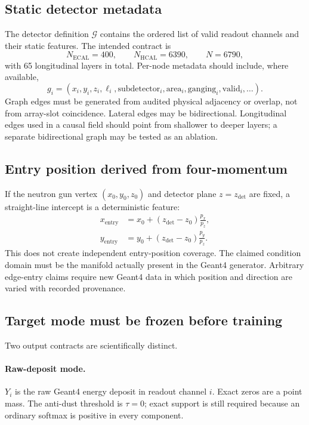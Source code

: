 \documentclass[11pt]{article}
\theoremstyle{definition}
\theoremstyle{remark}
\newcommand{\G}{\mathcal{G}}
\begin{document}
\subsection{Static detector metadata}
The detector definition $\G$ contains the ordered list of valid readout channels and their static features. The intended contract is
\begin{equation}
  N_{\mathrm{ECAL}}=400,\qquad N_{\mathrm{HCAL}}=6390,
  \qquad N=6790,
\end{equation}
with 65 longitudinal layers in total. Per-node metadata should include, where available,
\begin{equation}
  g_i=(x_i,y_i,z_i,\ell_i,\text{subdetector}_i,\text{area}_i,
  \text{ganging}_i,\text{valid}_i,\ldots).
\end{equation}
Graph edges must be generated from audited physical adjacency or overlap, not from array-slot coincidence. Lateral edges may be bidirectional. Longitudinal edges used in a causal field should point from shallower to deeper layers; a separate bidirectional graph may be tested as an ablation.

\subsection{Entry position derived from four-momentum}
If the neutron gun vertex $(x_0,y_0,z_0)$ and detector plane $z=z_{\mathrm{det}}$ are fixed, a straight-line intercept is a deterministic feature:
\begin{align}
 x_{\mathrm{entry}} &= x_0+(z_{\mathrm{det}}-z_0)\frac{p_x}{p_z},\\
 y_{\mathrm{entry}} &= y_0+(z_{\mathrm{det}}-z_0)\frac{p_y}{p_z}.
\end{align}
This does not create independent entry-position coverage. The claimed condition domain must be the manifold actually present in the Geant4 generator. Arbitrary edge-entry claims require new Geant4 data in which position and direction are varied with recorded provenance.

\subsection{Target mode must be frozen before training}
Two output contracts are scientifically distinct.

\paragraph{Raw-deposit mode.}
$Y_i$ is the raw Geant4 energy deposit in readout channel $i$. Exact zeros are a point mass. The anti-dust threshold is $\tau=0$; exact support is still required because an ordinary softmax is positive in every component.
\end{document}
